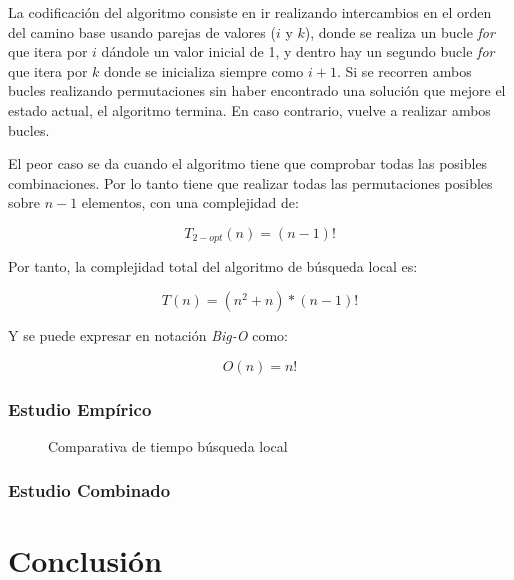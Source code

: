 \documentclass{uc3mpracticas}
\begin{document}
  \vspace{2mm}

  La codificación del algoritmo consiste en ir realizando intercambios en el orden del camino base usando parejas de valores ($i$ y $k$), donde se realiza un bucle \textit{for} que itera por $i$ dándole un valor inicial de 1, y dentro hay un segundo bucle \textit{for} que itera por $k$ donde se inicializa siempre como $i+1$. Si se recorren ambos bucles realizando permutaciones sin haber encontrado una solución que mejore el estado actual, el algoritmo termina. En caso contrario, vuelve a realizar ambos bucles.

  \vspace{2mm}


   El peor caso se da cuando el algoritmo tiene que comprobar todas las posibles combinaciones. Por lo tanto tiene que realizar todas las permutaciones posibles sobre $n-1$ elementos, con una complejidad de:

  $$T_{2-opt}(n) = (n-1)!$$

  Por tanto, la complejidad total del algoritmo de búsqueda local es:

  $$T(n) = (n^2 + n) * (n-1)!$$

  Y se puede expresar en notación \textit{Big-O} como:

  $$O(n) = n!$$




  \subsubsection{Estudio Empírico}

  \begin{figure}[!h]
    \caption{Comparativa de tiempo búsqueda local}
    \label{fig:compLocal}
  \end{figure}



  \subsubsection{Estudio Combinado}

  \clearpage

  \section{Conclusión}
\end{document}
